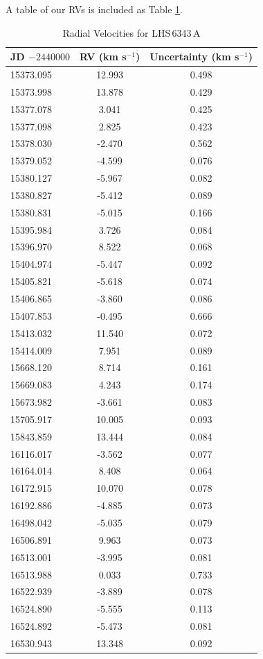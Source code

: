 A table of our RVs is included as Table \ref{RVTable}.

\begin{table}[hbt!]
\centering
\begin{tabular}{lcc}
\hline
JD $- 2440000$ & RV (km s$^{-1}$) & Uncertainty (km s$^{-1}$) \\
\hline
15373.095 & 12.993 & 0.498 \\ 
15373.998 & 13.878 & 0.429 \\ 
15377.078 & 3.041 & 0.425 \\ 
15377.098 & 2.825 & 0.423 \\ 
15378.030 & -2.470 & 0.562 \\ 
15379.052 & -4.599 & 0.076 \\ 
15380.127 & -5.967 & 0.082 \\ 
15380.827 & -5.412 & 0.089 \\ 
15380.831 & -5.015 & 0.166 \\ 
15395.984 & 3.726 & 0.084 \\ 
15396.970 & 8.522 & 0.068 \\ 
15404.974 & -5.447 & 0.092 \\ 
15405.821 & -5.618 & 0.074 \\ 
15406.865 & -3.860 & 0.086 \\ 
15407.853 & -0.495 & 0.666 \\ 
15413.032 & 11.540 & 0.072 \\ 
15414.009 & 7.951 & 0.089 \\ 
15668.120 & 8.714 & 0.161 \\ 
15669.083 & 4.243 & 0.174 \\ 
15673.982 & -3.661 & 0.083 \\ 
15705.917 & 10.005 & 0.093 \\ 
15843.859 & 13.444 & 0.084 \\ 
16116.017 & -3.562 & 0.077 \\ 
16164.014 & 8.408 & 0.064 \\ 
16172.915 & 10.070 & 0.078 \\ 
16192.886 & -4.885 & 0.073 \\ 
16498.042 & -5.035 & 0.079 \\ 
16506.891 & 9.963 & 0.073 \\ 
16513.001 & -3.995 & 0.081 \\ 
16513.988 & 0.033 & 0.733 \\ 
16522.939 & -3.889 & 0.078 \\ 
16524.890 & -5.555 & 0.113 \\ 
16524.892 & -5.473 & 0.081 \\ 
16530.943 & 13.348 & 0.092  \\
\hline
\end{tabular}
\caption{Radial Velocities for LHS\,6343\,A}
\label{RVTable}
\end{table}



